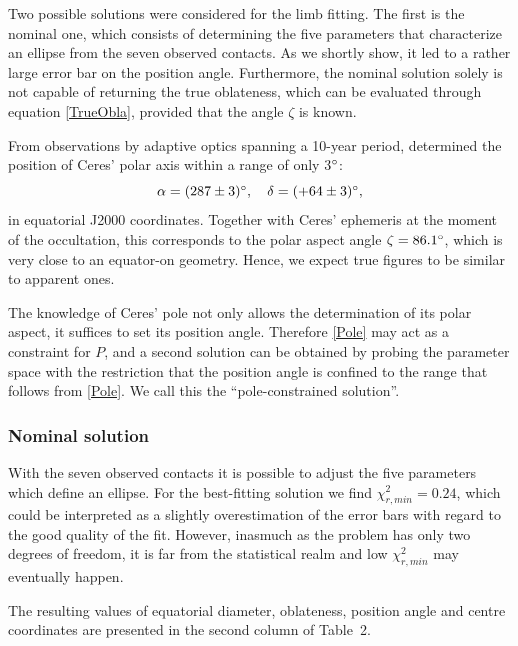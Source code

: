 \documentclass[useAMS,usenatbib]{mn2e}
\begin{document}
Two possible solutions were considered for the limb fitting. The first is the nominal one, which consists of determining the five parameters that characterize an ellipse from the seven observed contacts. As we shortly show, it led to a rather large error bar on the position angle. Furthermore, the nominal solution solely is not capable of returning the true oblateness, which can be evaluated through equation \eqref{TrueObla}, provided that the angle $\zeta$ is known.%

From observations by adaptive optics spanning a 10-year period, \cite{Drummond2014} determined the position of Ceres' polar axis within a range of only 3$\hbox{$^\circ$}$:
\begin{equation}
\alpha = (287 \pm 3) \degr, \quad %
\delta = (+64 \pm 3) \degr,
\label{Pole}
\end{equation}
%
in equatorial J2000 coordinates. Together with Ceres' ephemeris at the moment of the occultation, this corresponds to the polar aspect angle $\zeta = 86.1\hbox{$^\circ$}$, which is very close to an equator-on geometry. Hence, we expect true figures to be similar to apparent ones.

The knowledge of Ceres' pole not only allows the determination of its polar aspect, it suffices to set its position angle. Therefore \eqref{Pole} may act as a constraint for $P$, and a second solution can be obtained by probing the parameter space with the restriction that the position angle is confined to the range that follows from \eqref{Pole}. We call this the ``pole-constrained solution''.


\subsubsection{Nominal solution}

With the seven observed contacts it is possible to adjust the five parameters which define an ellipse. For the best-fitting solution we find $\chi^2_{r,min} = 0.24$, which could be interpreted as a slightly overestimation of the error bars with regard to the good quality of the fit. However, inasmuch as the problem has only two degrees of freedom, it is far from the statistical realm and low $\chi^2_{r,min}$ may eventually happen.

The resulting values of equatorial diameter, oblateness, position angle and centre coordinates are presented in the second column of Table~2.%
\end{document}
